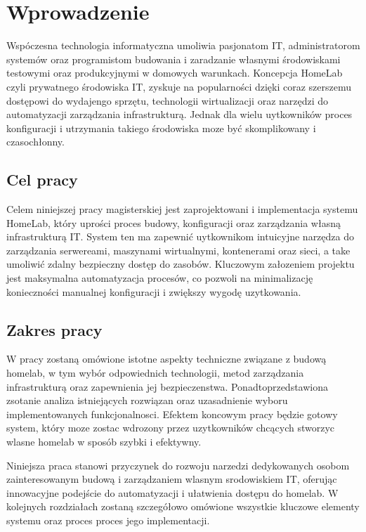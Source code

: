 \chapter{Wprowadzenie}
Wspóczesna technologia informatyczna umoliwia pasjonatom IT, administratorom systemów oraz programistom budowania i zaradzanie własnymi środowiskami testowymi oraz produkcyjnymi
w domowych warunkach. Koncepcja HomeLab czyli prywatnego środowiska IT, zyskuje na popularności dzięki coraz szerszemu dostępowi do wydajengo sprzętu, technologii wirtualizacji oraz narzędzi do automatyzacji zarządzania infrastrukturą.
Jednak dla wielu uytkowników proces konfiguracji i utrzymania takiego środowiska moze być skomplikowany i czasochłonny.


\section{Cel pracy}
Celem niniejszej pracy magisterskiej jest zaprojektowani i implementacja systemu HomeLab, który uprości proces budowy, konfiguracji oraz zarządzania własną infrastrukturą IT. System ten ma zapewnić uytkownikom intuicyjne narzędza do zarządzania serwereami, maszynami wirtualnymi, kontenerami oraz sieci, a take umoliwić zdalny bezpieczny dostęp do zasobów. Kluczowym załozeniem projektu jest maksymalna automatyzacja procesów, co pozwoli na minimalizację konieczności manualnej konfiguracji i zwiększy wygodę uzytkowania.

\section{Zakres pracy}
W pracy zostaną omówione istotne aspekty techniczne związane z budową homelab, w tym wybór odpowiednich technologii, metod zarządzania infrastrukturą oraz zapewnienia jej bezpieczenstwa. Ponadtoprzedstawiona zsotanie analiza istniejących rozwiązan oraz uzasadnienie wyboru implementowanych funkcjonalnosci. Efektem koncowym pracy będzie gotowy system, który moze zostac wdrozony przez uzytkowników chcących stworzyc wlasne homelab w sposób szybki i efektywny. 

Niniejsza praca stanowi przyczynek do rozwoju narzedzi dedykowanych osobom zainteresowanym budową i zarządzaniem wlasnym srodowiskiem IT, oferując innowacyjne podejście do automatyzacji i ułatwienia dostępu do homelab. W kolejnych rozdziałach zostaną szczegółowo omówione wszystkie kluczowe elementy systemu oraz proces proces jego implementacji.